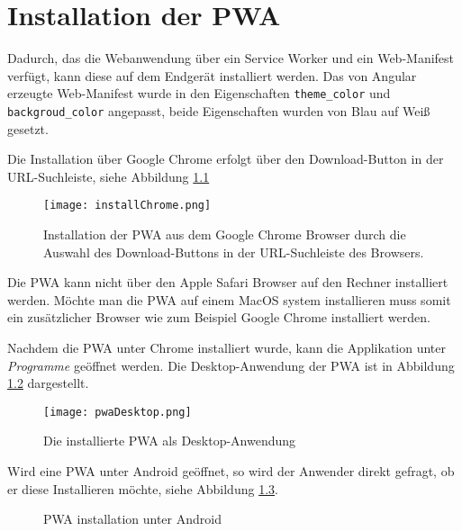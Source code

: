 \chapter{Installation der PWA}

Dadurch, das die Webanwendung über ein Service Worker und ein Web-Manifest verfügt, kann diese auf dem Endgerät installiert werden. Das von Angular erzeugte Web-Manifest wurde in den Eigenschaften \texttt{theme\_color} und \texttt{backgroud\_color} angepasst, beide Eigenschaften wurden von Blau auf Weiß gesetzt.

Die Installation über Google Chrome erfolgt über den Download-Button in der URL-Suchleiste, siehe Abbildung \ref{img:installChrome}

\begin{figure}[!htb]
    \centering
    \texttt{[image: installChrome.png]}
    \caption{Installation der PWA aus dem Google Chrome Browser durch die Auswahl des Download-Buttons in der URL-Suchleiste des Browsers.}
    \label{img:installChrome}
\end{figure}

Die PWA kann nicht über den Apple Safari Browser auf den Rechner installiert werden. Möchte man die PWA auf einem MacOS system installieren muss somit ein zusätzlicher Browser wie zum Beispiel Google Chrome installiert werden. 

Nachdem die PWA unter Chrome installiert wurde, kann die Applikation unter \textit{Programme} geöffnet werden. Die Desktop-Anwendung der PWA ist in Abbildung \ref{img:desktopPwa} dargestellt.

\begin{figure}[!htb]
    \centering
    \texttt{[image: pwaDesktop.png]}
    \caption{Die installierte PWA als Desktop-Anwendung}
    \label{img:desktopPwa}
\end{figure}


Wird eine PWA unter Android geöffnet, so wird der Anwender direkt gefragt, ob er diese Installieren möchte, siehe Abbildung \ref{img:installAndroid}.

\begin{figure}%
    \centering
    \qquad
    \caption{PWA installation unter Android}%
    \label{img:installAndroid}
  \end{figure}

